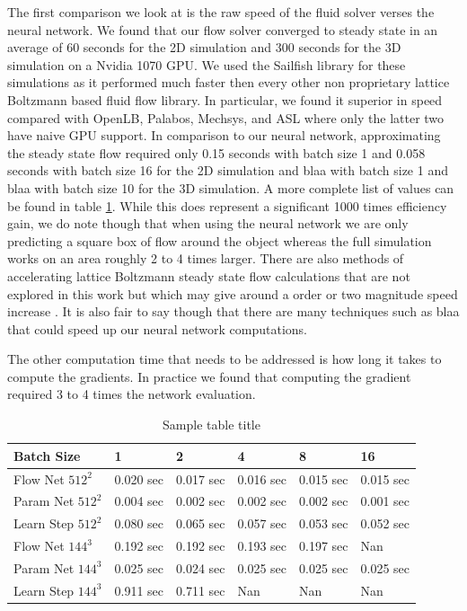 \documentclass{article} %
\begin{document}
The first comparison we look at is the raw speed of the fluid solver verses the neural network. We found that our flow solver converged to steady state in an average of 60 seconds for the 2D simulation and 300 seconds for the 3D simulation on a Nvidia 1070 GPU. We used the Sailfish library \cite{januszewski2014sailfish} for these simulations as it performed much faster then every other non proprietary lattice Boltzmann based fluid flow library. In particular, we found it superior in speed compared with OpenLB, Palabos, Mechsys, and ASL where only the latter two have naive GPU support. In comparison to our neural network, approximating the steady state flow required only 0.15 seconds with batch size 1 and 0.058 seconds with batch size 16 for the 2D simulation and blaa with batch size 1 and blaa with batch size 10 for the 3D simulation. A more complete list of values can be found in table \ref{computation_table}. While this does represent a significant 1000 times efficiency gain, we do note though that when using the neural network we are only predicting a square box of flow around the object whereas the full simulation works on an area roughly 2 to 4 times larger. There are also methods of accelerating lattice Boltzmann steady state flow calculations that are not explored in this work but which may give around a order or two magnitude speed increase \cite{guo2013lattice} \cite{bernaschi2002computing}. It is also fair to say though that there are many techniques such as blaa that could speed up our neural network computations.

The other computation time that needs to be addressed is how long it takes to compute the gradients. In practice we found that computing the gradient required 3 to 4 times the network evaluation.


\begin{table}[t]
\caption{Sample table title}
\label{computation_table}
\begin{center}
\begin{tabular}{l|lllll}
Batch Size & 1 & 2 & 4 & 8 & 16 \\ \hline 
Flow Net $512^2$ & 0.020 sec & 0.017 sec & 0.016 sec & 0.015 sec & 0.015 sec \\ 
Param Net $512^2$ & 0.004 sec & 0.002 sec & 0.002 sec & 0.002 sec & 0.001 sec \\ 
Learn Step $512^2$ & 0.080 sec & 0.065 sec & 0.057 sec & 0.053 sec & 0.052 sec \\ 
Flow Net $144^3$ & 0.192 sec & 0.192 sec & 0.193 sec & 0.197 sec & Nan \\ 
Param Net $144^3$ & 0.025 sec & 0.024 sec & 0.025 sec & 0.025 sec & 0.025 sec \\ 
Learn Step $144^3$ & 0.911 sec & 0.711 sec & Nan & Nan & Nan \\ 
\end{tabular}
\end{center}
\end{table}
\end{document}
